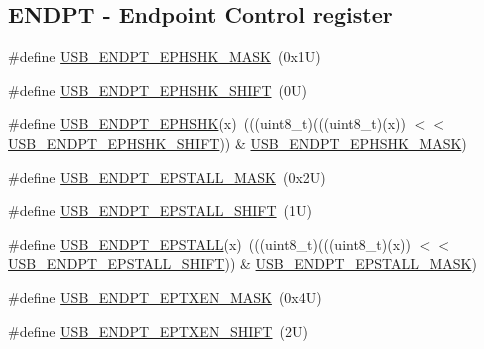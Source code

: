 \subsection*{E\+N\+D\+PT -\/ Endpoint Control register}
\begin{DoxyCompactItemize}
\item 
\#define \mbox{\hyperlink{group___u_s_b___register___masks_ga9266b40af26177a6659041e0229e76e7}{U\+S\+B\+\_\+\+E\+N\+D\+P\+T\+\_\+\+E\+P\+H\+S\+H\+K\+\_\+\+M\+A\+SK}}~(0x1\+U)
\item 
\#define \mbox{\hyperlink{group___u_s_b___register___masks_ga477c6b1ea91137b6ebd65d0574a7b611}{U\+S\+B\+\_\+\+E\+N\+D\+P\+T\+\_\+\+E\+P\+H\+S\+H\+K\+\_\+\+S\+H\+I\+FT}}~(0\+U)
\item 
\#define \mbox{\hyperlink{group___u_s_b___register___masks_ga25141556db24bfad0ff1a5636629993f}{U\+S\+B\+\_\+\+E\+N\+D\+P\+T\+\_\+\+E\+P\+H\+S\+HK}}(x)~(((uint8\+\_\+t)(((uint8\+\_\+t)(x)) $<$$<$ \mbox{\hyperlink{group___u_s_b___register___masks_ga477c6b1ea91137b6ebd65d0574a7b611}{U\+S\+B\+\_\+\+E\+N\+D\+P\+T\+\_\+\+E\+P\+H\+S\+H\+K\+\_\+\+S\+H\+I\+FT}})) \& \mbox{\hyperlink{group___u_s_b___register___masks_ga9266b40af26177a6659041e0229e76e7}{U\+S\+B\+\_\+\+E\+N\+D\+P\+T\+\_\+\+E\+P\+H\+S\+H\+K\+\_\+\+M\+A\+SK}})
\item 
\#define \mbox{\hyperlink{group___u_s_b___register___masks_ga57a65ef14a5d868dcd964177fe6daad2}{U\+S\+B\+\_\+\+E\+N\+D\+P\+T\+\_\+\+E\+P\+S\+T\+A\+L\+L\+\_\+\+M\+A\+SK}}~(0x2\+U)
\item 
\#define \mbox{\hyperlink{group___u_s_b___register___masks_ga38af6f0d87e04be4f9f19cca981765cb}{U\+S\+B\+\_\+\+E\+N\+D\+P\+T\+\_\+\+E\+P\+S\+T\+A\+L\+L\+\_\+\+S\+H\+I\+FT}}~(1\+U)
\item 
\#define \mbox{\hyperlink{group___u_s_b___register___masks_ga945b97861d1e8a812ef88c98c308e0f1}{U\+S\+B\+\_\+\+E\+N\+D\+P\+T\+\_\+\+E\+P\+S\+T\+A\+LL}}(x)~(((uint8\+\_\+t)(((uint8\+\_\+t)(x)) $<$$<$ \mbox{\hyperlink{group___u_s_b___register___masks_ga38af6f0d87e04be4f9f19cca981765cb}{U\+S\+B\+\_\+\+E\+N\+D\+P\+T\+\_\+\+E\+P\+S\+T\+A\+L\+L\+\_\+\+S\+H\+I\+FT}})) \& \mbox{\hyperlink{group___u_s_b___register___masks_ga57a65ef14a5d868dcd964177fe6daad2}{U\+S\+B\+\_\+\+E\+N\+D\+P\+T\+\_\+\+E\+P\+S\+T\+A\+L\+L\+\_\+\+M\+A\+SK}})
\item 
\#define \mbox{\hyperlink{group___u_s_b___register___masks_ga3d498f31497071c5ff6ad30e89b7c26e}{U\+S\+B\+\_\+\+E\+N\+D\+P\+T\+\_\+\+E\+P\+T\+X\+E\+N\+\_\+\+M\+A\+SK}}~(0x4\+U)
\item 
\#define \mbox{\hyperlink{group___u_s_b___register___masks_gad281aa3cd601a2a93f60e0145dd8e564}{U\+S\+B\+\_\+\+E\+N\+D\+P\+T\+\_\+\+E\+P\+T\+X\+E\+N\+\_\+\+S\+H\+I\+FT}}~(2\+U)

\end{DoxyCompactItemize}
